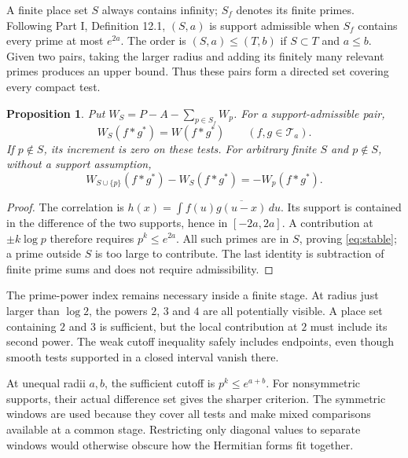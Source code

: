 \documentclass[11pt,letterpaper]{article}
\newtheorem{proposition}[theorem]{Proposition}
\theoremstyle{definition}
\theoremstyle{remark}
\newcommand{\T}{\mathcal T}
\begin{document}
A finite place set $S$ always contains infinity; $S_f$ denotes its
finite primes. Following Part I, Definition 12.1, $(S,a)$ is
support admissible when $S_f$ contains every prime at most $e^{2a}$.
The order is $(S,a)\le(T,b)$ if $S\subset T$ and $a\le b$.
Given two pairs, taking the larger radius and adding its finitely
many relevant primes produces an upper bound. Thus these pairs form
a directed set covering every compact test.

\begin{proposition}\label{prop:stability}
Put $W_S=P-A-\sum_{p\in S_f}W_p$. For a support-admissible pair,
\begin{equation}
 W_S(f*g^*)=W(f*g^*)\qquad(f,g\in\T_a).
 \label{eq:stable}
\end{equation}
If $p\notin S$, its increment is zero on these tests. For arbitrary
finite $S$ and $p\notin S$, without a support assumption,
\begin{equation}
 W_{S\cup\{p\}}(f*g^*)-W_S(f*g^*)=-W_p(f*g^*).
 \label{eq:intermediate}
\end{equation}
\end{proposition}
\begin{proof}
The correlation is $h(x)=\int f(u)\overline{g(u-x)}\,du$.
Its support is contained in the difference of the two supports,
hence in $[-2a,2a]$. A contribution at $\pm k\log p$ therefore
requires $p^k\le e^{2a}$. All such primes are in $S$, proving
\eqref{eq:stable}; a prime outside $S$ is too large to contribute.
The last identity is subtraction of finite prime sums and does not
require admissibility.
\end{proof}

The prime-power index remains necessary inside a finite stage.
At radius just larger than $\log2$, the powers $2$, $3$ and $4$
are all potentially visible. A place set containing $2$ and $3$
is sufficient, but the local contribution at $2$ must include its
second power. The weak cutoff inequality safely includes endpoints,
even though smooth tests supported in a closed interval vanish there.

At unequal radii $a,b$, the sufficient cutoff is $p^k\le e^{a+b}$.
For nonsymmetric supports, their actual difference set gives the
sharper criterion. The symmetric windows are used because they cover
all tests and make mixed comparisons available at a common stage.
Restricting only diagonal values to separate windows would otherwise
obscure how the Hermitian forms fit together.
\end{document}
